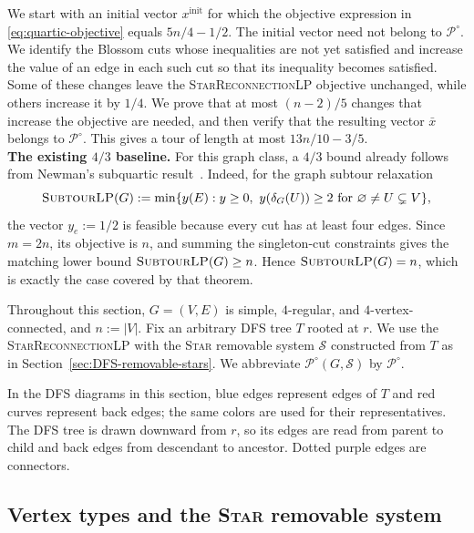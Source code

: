 \documentclass[11pt]{amsart}
\newcommand{\1}{\mathbbm{1}}
\newcommand{\SubtourLP}{\textsc{SubtourLP}}
\newcommand{\LPtwo}{\textsc{StarReconnectionLP}}
\begin{document}
We start with an initial vector $x^{\mathrm{init}}$ for which the objective expression in
\eqref{eq:quartic-objective} equals $5n/4-1/2$.
The initial vector need not belong to ${\mathcal P^\circ}$.
We identify the Blossom cuts whose inequalities are not yet
satisfied and increase the value of an edge in each such cut
so that its inequality becomes satisfied. Some of these changes
leave the \LPtwo{} objective unchanged, while others increase
it by $1/4$. We prove that at most $(n-2)/5$ changes that increase
the objective are needed, and then verify that the resulting
vector $\bar x$ belongs to ${\mathcal P^\circ}$. This gives a tour of
length at most $13n/10-3/5$.\\

\textbf{The existing $4/3$ baseline.}
For this graph class, a $4/3$ bound already follows from Newman's
subquartic result~\cite[Theorem~1]{Newman}. Indeed, for the graph
subtour relaxation
\[
 {\text{\SubtourLP}(G)}
 :=\min\{y(E):y\ge0,\ y(\delta_G(U))\ge2
       \text{ for }\varnothing\ne U\subsetneq V\},
\]
the vector $y_e:=1/2$ is feasible because every cut has at least
four edges. Since $m=2n$, its objective is $n$, and summing the
singleton-cut constraints gives the matching lower bound
${\text{\SubtourLP}(G)}\ge n$. Hence
${\text{\SubtourLP}(G)}=n$, which is exactly the case
covered by that theorem.


Throughout this section, $G=(V,E)$ is simple, $4$-regular, and
$4$-vertex-connected, and $n:=|V|$. Fix an arbitrary DFS tree
$T$ rooted at $r$. We use the \LPtwo{} with the \textsc{Star} removable system
$\mathcal S$ constructed from $T$ as in
Section~\ref{sec:DFS-removable-stars}.
We abbreviate ${\mathcal P^\circ}(G,\mathcal S)$ by
${\mathcal P^\circ}$.

{In the DFS diagrams in this section, blue edges
represent edges of $T$ and red curves represent back edges;
the same colors are used for their representatives.
The DFS tree is drawn downward from $r$, so its edges are
read from parent to child and back edges from descendant
to ancestor. Dotted purple edges are connectors.}

\subsection{Vertex types and the \textsc{Star} removable system}
\end{document}
